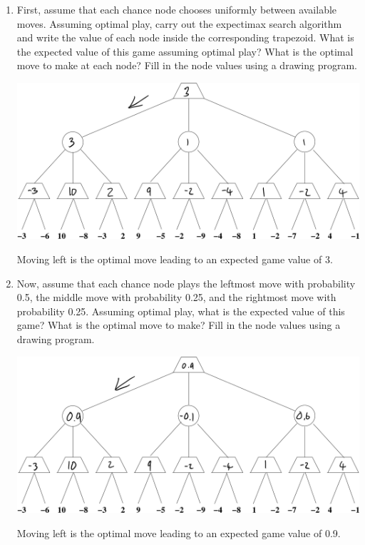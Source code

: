 \documentclass[12pt]{article}
\begin{document}
\begin{enumerate}

\item First, assume that each chance node chooses uniformly between
  available moves. Assuming optimal play, carry out the expectimax
  search algorithm and write the value of each node inside the
  corresponding trapezoid. What is the expected value of this game
  assuming optimal play? What is the optimal move to make at each
  node?  Fill in the node values using a drawing program.

\begin{center}
\includegraphics[width=6in]{Q1.png}
\end{center}

Moving left is the optimal move leading to an expected game value of 3.

\clearpage

\item Now, assume that each chance node plays the leftmost move with
  probability 0.5, the middle move with probability 0.25, and the
  rightmost move with probability 0.25. Assuming optimal play, what is
  the expected value of this game?  What is the optimal move to make?
  Fill in the node values using a drawing program.

\begin{center}
\includegraphics[width=6in]{Q2.png}
\end{center}

Moving left is the optimal move leading to an expected game value of 0.9.

\end{enumerate}
\end{document}
